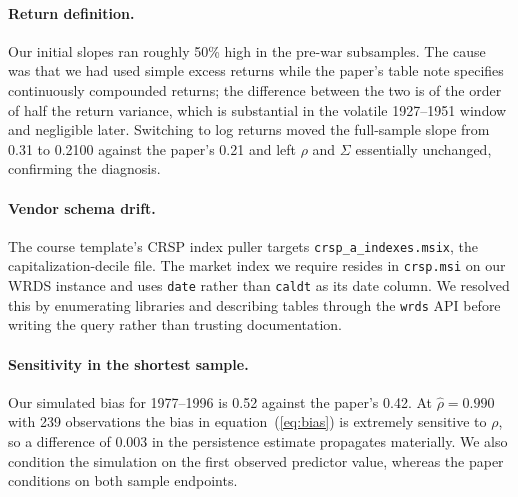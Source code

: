 \documentclass[11pt]{article}
\begin{document}


\paragraph{Return definition.} Our initial slopes ran roughly 50\% high in the
pre-war subsamples. The cause was that we had used simple excess returns while
the paper's table note specifies continuously compounded returns; the difference
between the two is of the order of half the return variance, which is
substantial in the volatile 1927--1951 window and negligible later. Switching to
log returns moved the full-sample slope from 0.31 to 0.2100 against the paper's
0.21 and left $\rho$ and $\Sigma$ essentially unchanged, confirming the
diagnosis.

\paragraph{Vendor schema drift.} The course template's CRSP index puller targets
\texttt{crsp\_a\_indexes.msix}, the capitalization-decile file. The market index
we require resides in \texttt{crsp.msi} on our WRDS instance and uses
\texttt{date} rather than \texttt{caldt} as its date column. We resolved this by
enumerating libraries and describing tables through the \texttt{wrds} API before
writing the query rather than trusting documentation.

\paragraph{Sensitivity in the shortest sample.} Our simulated bias for
1977--1996 is 0.52 against the paper's 0.42. At $\hat\rho = 0.990$ with 239
observations the bias in equation~(\ref{eq:bias}) is extremely sensitive to
$\rho$, so a difference of 0.003 in the persistence estimate propagates
materially. We also condition the simulation on the first observed predictor
value, whereas the paper conditions on both sample endpoints.
\end{document}
